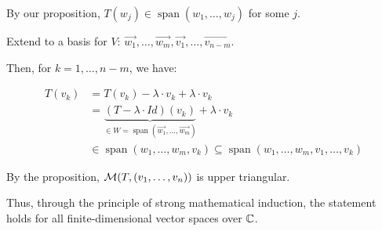{{{			By our proposition, \(T(w_{j}) \in \operatorname{span}\left( w_1, \ldots, w_{j} \right) \) for some \(j\).

			Extend to a basis for \(V\): \(\vec{w_1}, \ldots, \vec{w_m}, \vec{v_{1}}, \ldots, \vec{v_{n-m}} \).

			Then, for \( k = 1, \ldots, n - m\), we have:

			\begin{align*}
				T(v_{k}) & = T(v_{k}) - \lambda \cdot v_{k} + \lambda \cdot v_{k}                                                                                               \\
				         & = \underbrace{(T - \lambda \cdot Id)(v_{k})}_{\in W = \operatorname{span}\left( \vec{w_1}, \ldots, \vec{w_m}  \right) } + \lambda \cdot v_{k}        \\
				         & \in \operatorname{span}\left( w_1, \ldots, w_{m}, v_{k} \right) \subseteq \operatorname{span}\left( w_1, \ldots, w_{m}, v_{1}, \ldots, v_{k} \right)
			\end{align*}

			By the proposition, \(\mathcal{M}(T, (v_1, \ldots, v_n))\) is upper triangular.

		}

		Thus, through the principle of strong mathematical induction, the statement holds for all finite-dimensional vector spaces over \(\CC\).
	}
}


